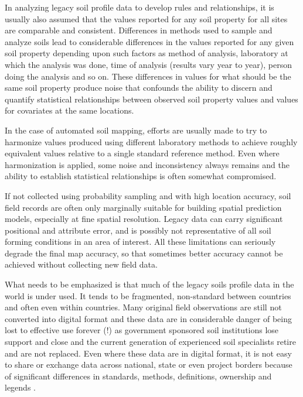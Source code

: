 \documentclass[graybox,natbib,nospthms,UStrade]{svmono}
\let\BeginKnitrBlock\begin \let\EndKnitrBlock\end
\let\BeginKnitrBlock\begin \let\EndKnitrBlock\end
\begin{document}
In analyzing legacy soil profile data to develop rules and
relationships, it is usually also assumed that the values reported for
any soil property for all sites are comparable and consistent.
Differences in methods used to sample and analyze soils lead to
considerable differences in the values reported for any given soil
property depending upon such factors as method of analysis, laboratory
at which the analysis was done, time of analysis (results vary year to
year), person doing the analysis and so on. These differences in values
for what should be the same soil property produce noise that confounds
the ability to discern and quantify statistical relationships between
observed soil property values and values for covariates at the same
locations.

In the case of automated soil mapping, efforts are usually made to try
to harmonize values produced using different laboratory methods to
achieve roughly equivalent values relative to a single standard
reference method. Even where harmonization is applied, some noise and
inconsistency always remains and the ability to establish statistical
relationships is often somewhat compromised.

\BeginKnitrBlock{rmdnote}
If not collected using probability
sampling and with high location accuracy, soil field records are often
only marginally suitable for building spatial prediction models,
especially at fine spatial resolution. Legacy data can carry significant
positional and attribute error, and is possibly not representative of
all soil forming conditions in an area of interest. All these
limitations can seriously degrade the final map accuracy, so that
sometimes better accuracy cannot be achieved without collecting new
field data.
\EndKnitrBlock{rmdnote}

What needs to be emphasized is that much of the legacy soils profile
data in the world is under used. It tends to be fragmented, non-standard
between countries and often even within countries. Many original
field observations are still not converted into digital format and these
data are in considerable danger of being lost to effective use forever
(!) as government sponsored soil institutions lose support and close and
the current generation of experienced soil specialists retire and are
not replaced. Even where these data are in digital format, it is not
easy to share or exchange data across national, state or even project
borders because of significant differences in standards, methods,
definitions, ownership and legends \citep{Omuto2012GSP}.
\end{document}
